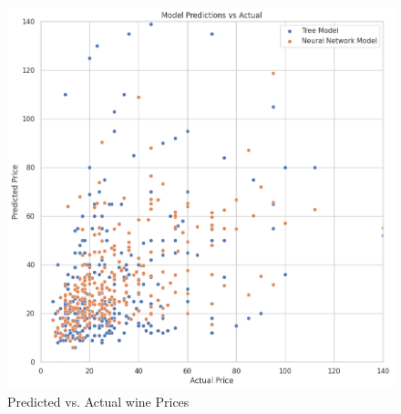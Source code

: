 \begin{figure}[H]
    \centering
    \includegraphics[width=0.99\columnwidth]{images/scatter_regressor_price.png}
    \caption{Predicted vs. Actual wine Prices}
    \label{fig:scatter_regressor_price}
\end{figure}